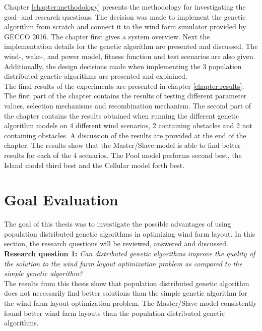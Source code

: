 \noindent Chapter \ref{chapter:methodology} presents the methodology for investigating the goal- and research questions. The decision was made to implement the genetic algorithm from scratch and connect it to the wind farm simulator provided by GECCO 2016. The chapter first gives a system overview. Next the implementation details for the genetic algorithm are presented and discussed. The wind-, wake-, and power model, fitness function and test scenarios are also given. Additionally, the design decisions made when implementing the 3 population distributed genetic algorithms are presented and explained.\\


\noindent The final results of the experiments are presented in chapter \ref{chapter:results}. The first part of the chapter contains the results of testing different parameter values, selection mechanisms and recombination mechanism. The second part of the chapter contains the results obtained when running the different genetic algorithm models on 4 different wind scenarios, 2 containing obstacles and 2 not containing obstacles. A discussion of the results are provided at the end of the chapter. The results show that the Master/Slave model is able to find better results for each of the 4 scenarios. The Pool model performs second best, the Island model third best and the Cellular model forth best.\\


\section{Goal Evaluation}\label{section:goal evaluation}


\noindent The goal of this thesis was to investigate the possible advantages of using population distributed genetic algorithms in optimizing wind farm layout. In this section, the research questions will be reviewed, answered and discussed.\\


\noindent \textbf{Research question 1: } \textit{Can distributed genetic algorithms improve the quality of the solution to the wind farm layout optimization problem as compared to the simple genetic algorithm?}\\


\noindent The results from this thesis show that population distributed genetic algorithm does not necessarily find better solutions than the simple genetic algorithm for the wind farm layout optimization problem. The Master/Slave model consistently found better wind farm layouts than the population distributed genetic algorithms. \\



